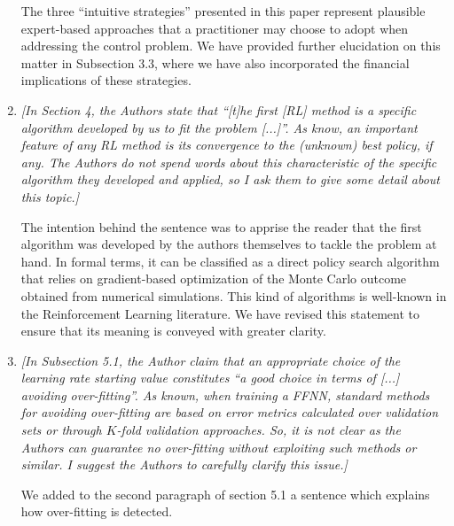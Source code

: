 \documentclass{article}
\newcommand{\quotations}[1]{``#1''}
\begin{document}
\begin{enumerate}
 The three \quotations{intuitive strategies} presented in this paper represent plausible expert-based approaches that a practitioner may choose to adopt when addressing the control problem. We have provided further elucidation on this matter in Subsection 3.3, where we have also incorporated the financial implications of these strategies.
 
 \item \textit{[In Section 4, the Authors state that ``[t]he first [RL] method is a specific algorithm developed by us to fit the problem [...]''. As know, an important feature of any RL method is its convergence to the (unknown) best policy, if any. The Authors do not spend words about this characteristic of the specific algorithm they developed and applied, so I ask them to give some detail about this topic.]} 
 
 The intention behind the sentence was to apprise the reader that the first algorithm was developed by the authors themselves to tackle the problem at hand. In formal terms, it can be classified as a direct policy search algorithm that relies on gradient-based optimization of the Monte Carlo outcome obtained from numerical simulations. This kind of algorithms is well-known in the Reinforcement Learning literature. We have revised this statement to ensure that its meaning is conveyed with greater clarity. 

 \item \textit{[In Subsection 5.1, the Author claim that an appropriate choice of the learning rate starting value constitutes ``a good choice in terms of [...] avoiding over-fitting''. As known, when training a FFNN, standard methods for avoiding over-fitting are based on error metrics calculated over validation sets or through $K$-fold validation approaches. So, it is not clear as the Authors can guarantee no over-fitting without exploiting such methods or similar. I suggest the Authors to carefully clarify this issue.]} 
 
We added to the second paragraph of section 5.1 a sentence which explains how over-fitting is detected.

 \end{enumerate}
\end{document}
